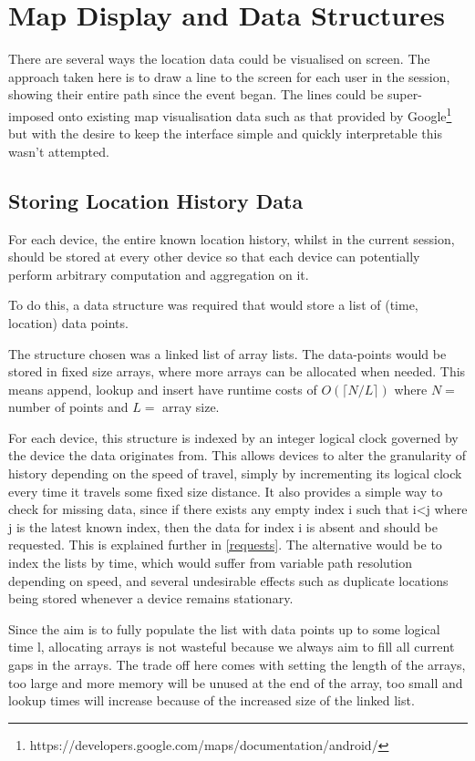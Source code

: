 \section{Map Display and Data Structures}

There are several ways the location data could be visualised on screen. The approach taken here is to draw a line to the screen for each user in the session, showing their entire path since the event began. The lines could be super-imposed onto existing map visualisation data such as that provided by Google\footnote{https://developers.google.com/maps/documentation/android/} but with the desire to keep the interface simple and quickly interpretable this wasn't attempted.

\subsection{Storing Location History Data}

For each device, the entire known location history, whilst in the current session, should be stored at every other device so that each device can potentially perform arbitrary computation and aggregation on it.

To do this, a data structure was required that would store a list of (time, location) data points.

The structure chosen was a linked list of array lists. The data-points would be stored in fixed size arrays, where more arrays can be allocated when needed. This means append, lookup and insert have runtime costs of $ O(\lceil N/L \rceil ) $ where $ N = $ number of points and $ L =$ array size.

For each device, this structure is indexed by an integer logical clock governed by the device the data originates from. This allows devices to alter the granularity of history depending on the speed of travel, simply by incrementing its logical clock every time it travels some fixed size distance. It also provides a simple way to check for missing data, since if there exists any empty index i such that i<j where j is the latest known index, then the data for index i is absent and should be requested. This is explained further in \ref{requests}.
The alternative would be to index the lists by time, which would suffer from variable path resolution depending on speed, and several undesirable effects such as duplicate locations being stored whenever a device remains stationary.

Since the aim is to fully populate the list with data points up to some logical time l, allocating arrays is not wasteful because we always aim to fill all current gaps in the arrays. The trade off here comes with setting the length of the arrays, too large and more memory will be unused at the end of the array, too small and lookup times will increase because of the increased size of the linked list.

